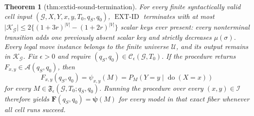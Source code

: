 \documentclass{article}
\newtheorem{theorem}{Theorem}
\begin{document}
\begin{theorem}[thm:extid-sound-termination]\label{thm:extid-sound-termination}
For every finite syntactically valid cell input \((\mathcal G,X,Y,x,y,T_0,q_S,q_0)\), \(\operatorname{EXT\text{-}ID}\) terminates with at most \(\lvert\mathscr K_{\mathcal G}\rvert\le2\{(1+3r)^{\lvert V\rvert}-(1+2r)^{\lvert V\rvert}\}\) scalar keys ever present: every nonterminal transition adds one previously absent scalar key and strictly decreases \(\mu(\sigma)\). Every legal move instance belongs to the finite universe \(\mathscr U\), and its output remains in \(\mathscr K_{\mathcal G}\). Fix \(\epsilon>0\) and require \((q_S,q_0)\in\mathcal C_{\epsilon}(\mathcal G,T_0)\). If the procedure returns \(F_{x,y}\in\mathcal A(q_S,q_0)\), then \[F_{x,y}(q_S,q_0)=\psi_{x,y}(M)=P_M(Y=y\mid\operatorname{do}(X=x))\] for every \(M\in\mathfrak F_{\epsilon}(\mathcal G,T_0;q_S,q_0)\). Running the procedure over every \((x,y)\in\mathcal I\) therefore yields \(\mathbf F(q_S,q_0)=\boldsymbol\psi(M)\) for every model in that exact fiber whenever all cell runs succeed.
\end{theorem}
\end{document}
